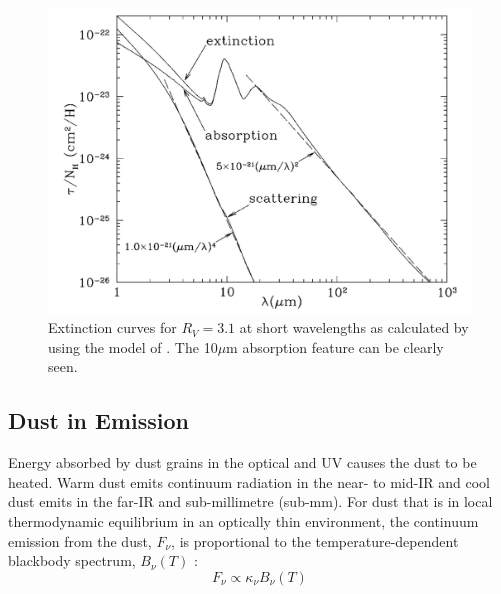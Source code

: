 \begin{figure}
\centering
\includegraphics[clip=true,scale=0.43,trim= 0 0 0 0]{chapters/chapter1/figs/extinction_curve_10um.png}
\caption{Extinction curves for  $R_V=3.1$ at short wavelengths as calculated by  \citet{Draine2003} using the model of \citet{Weingartner2001}.  The 10$\mu$m absorption feature can be clearly seen.}
\label{fig:extinction_curve_10um}
\end{figure}

\subsection{Dust in Emission}
\label{scn:emission}
Energy absorbed by dust grains in the optical and UV causes the dust to be heated.  Warm dust emits continuum radiation in the near- to mid-IR and cool dust emits in the far-IR and sub-millimetre (sub-mm).  For dust that is in local thermodynamic equilibrium in an optically thin environment, the continuum emission from the dust, $F_{\nu}$,  is proportional to the temperature-dependent blackbody spectrum, $B_{\nu}(T)$ \citep{Hildebrand1983}:
\begin{equation}
\label{BB_flux}
F_{\nu}\propto \kappa_{\nu} B_{\nu}(T)
\end{equation}

